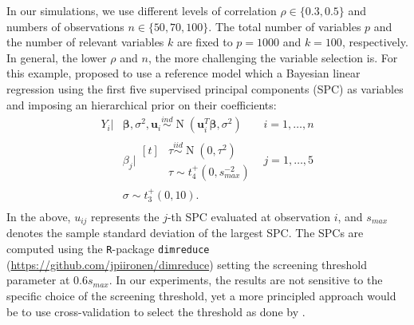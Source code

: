 \documentclass[a4]{article}
\theoremstyle{definition}
\DeclareMathOperator{\N}{N}
\begin{document}
In our simulations, we use different levels of correlation 
$\rho\in\{0.3,0.5\}$ and numbers of
observations $n\in\{50,70,100\}$. The total number of variables $p$
and the number of relevant variables $k$ are fixed to $p = 1000$ and
$k = 100$, respectively. In general, the lower $\rho$ and $n$, the
more challenging the variable selection is. For this example, \citet{paper:projpred} proposed to
use a reference model which a Bayesian linear regression using the first five
supervised principal components (SPC) as variables and imposing an hierarchical prior on
their coefficients:
\begin{equation}
\label{eq:ref_mod}
\begin{aligned}
    Y_{i}|&\boldsymbol{\beta},\sigma^{2},\boldsymbol{u}_{i} \overset{ind}{\sim} \N(\boldsymbol{u}_{i}^{T}\boldsymbol{\beta},\sigma^{2}) \quad &i=1,\ldots,n \\
    &\beta_{j}|\!\begin{aligned}[t] &\tau \overset{iid}{\sim} \N(0,\tau^{2})\\
    &\tau \sim t_{4}^{+}(0,s_{max}^{-2}) 
    \end{aligned} &j=1,\ldots,5 \\ 
    &\sigma \sim t_{3}^{+}(0,10). \\
\end{aligned}
\end{equation}
In the above, $u_{ij}$ represents the $j$-th SPC evaluated at
observation $i$, and $s_{max}$ denotes the sample standard deviation
of the largest SPC.  The SPCs are computed using the
\texttt{R}-package \texttt{dimreduce} (\url{https://github.com/jpiironen/dimreduce}) setting the screening threshold
parameter at $0.6s_{max}$.  In our experiments, the results are not
sensitive to the specific choice of the screening threshold, yet a more
principled approach would be to use cross-validation to select the
threshold as done by \citet{paper:projpred}.

\end{document}
